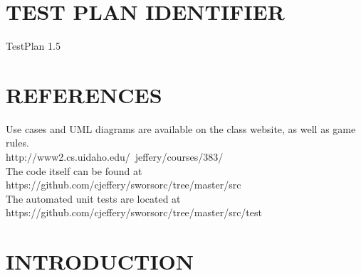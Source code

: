 \setcounter{tocdepth}{9}
\renewcommand\contentsname{}
\tableofcontents

\bigskip

\bigskip
\setcounter{page}{1}\pagestyle{Convertiv}

\section[IDENTIFIER]{\bfseries\color{black}
TEST PLAN IDENTIFIER}

{\color{black}
TestPlan 1.5\\}


\section[REFERENCES]{\bfseries\color{black}
REFERENCES}

{\color{black}
Use cases and UML diagrams are available on the class website, as well as game rules.\\
http://www2.cs.uidaho.edu/~jeffery/courses/383/ \\
The code itself can be found at https://github.com/cjeffery/sworsorc/tree/master/src\\
The automated unit tests are located at https://github.com/cjeffery/sworsorc/tree/master/src/test
}

\section[INTRODUCTION]{\bfseries\color{black} INTRODUCTION}

